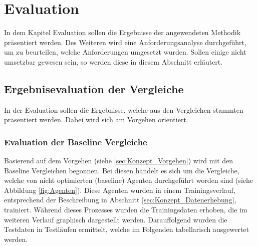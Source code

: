 \chapter{Evaluation} \label{chap:Evaluation}
In dem Kapitel Evaluation sollen die Ergebnisse der angewendeten Methodik präsentiert werden. Des Weiteren wird eine Anforderungsanalyse durchgeführt, um zu beurteilen, welche Anforderungen umgesetzt wurden. Sollen einige nicht umsetzbar gewesen sein, so werden diese in diesem Abschnitt erläutert.

\section{Ergebnisevaluation der Vergleiche} \label{sec:Evaluation_Ergebnisevaluation}
In der Evaluation sollen die Ergebnisse, welche aus den Vergleichen stammten präsentiert werden. Dabei wird sich am Vorgehen orientiert.

\subsection{Evaluation der Baseline Vergleiche}
Basierend auf dem Vorgehen (siehe \ref{sec:Konzept_Vorgehen}) wird mit den Baseline Vergleichen begonnen. Bei diesen handelt es sich um die Vergleiche, welche von  nicht optimierten (baseline) Agenten durchgeführt worden sind (siehe Abbildung \ref{fig:Agenten}). Diese Agenten wurden in einem Trainingsverlauf, entsprechend der Beschreibung in Abschnitt \ref{sec:Konzept_Datenerhebung}, trainiert. 
Während dieses Prozesses wurden die Trainingsdaten erhoben, die im weiteren Verlauf graphisch dargestellt werden. Darauffolgend wurden die Testdaten in Testläufen ermittelt, welche im Folgenden tabellarisch ausgewertet werden.

